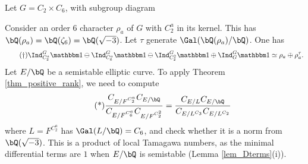 \begin{example}\label{ex-C2C6}
    Let $G = C_2 \times C_6$, with subgroup diagram
    \begin{figure}[H]
        \centering
    \end{figure}
    
    Consider an order $6$ character $\rho_a$ of $G$ with $C_2^{a}$ in its kernel. This has $\bQ(\rho_a) = \bQ(\zeta_6) = \bQ(\sqrt{-3})$. Let $\tau$ generate $\Gal(\bQ(\rho_a) / \bQ)$. One has
    \begin{equation}\label{ex1-rel}\tag{\textdagger}
    \Ind_{C_2^{a}}^G \trivial  \ominus \Ind_{C_6^{a}}^G \trivial \ominus \Ind_{C_2^{2}}^G \trivial \oplus \Ind_G^G \trivial \simeq \rho_a \oplus \rho_a^{\tau} .
    \end{equation}
    Let $E / \bQ$ be a semistable elliptic curve. To apply Theorem \ref{thm_positive_rank}, we need to compute
    \begin{equation}\label{ex1}\tag{*} 
        \frac{C_{E / F^{C_2^a}} C_{E / \bQ} }{C_{E / F^{C_6^a}} C_{E / F^{C_2^2}}} = 
        \frac{C_{E / L} C_{E / \bQ}}{C_{E / L^{C_3}} C_{E / L^{C_2}}}
    \end{equation} 
    where $L = F^{C_2^a}$ has $\Gal(L / \bQ) = C_6$, and check whether it is a norm from $\bQ(\sqrt{-3})$. This is a product of local Tamagawa numbers, as the minimal differential terms are $1$ when $E / \bQ$ is semistable (Lemma \ref{lem_Dterms}(i)). 
    

\end{example}
